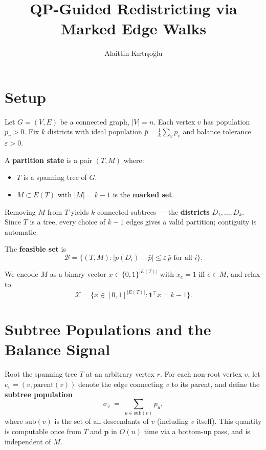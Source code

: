 \documentclass[11pt]{article}
\newcommand{\pbar}{\bar{p}}
\begin{document}
\title{QP-Guided Redistricting via Marked Edge Walks}
\author{Alaittin K\i rt\i \c{s}o\u{g}lu}
\maketitle


\section{Setup}\label{sec:setup}

Let $G = (V,E)$ be a connected graph, $|V| = n$. Each vertex $v$ has population $p_v > 0$. Fix $k$ districts with ideal population $\pbar = \frac{1}{k}\sum_v p_v$ and balance tolerance $\varepsilon > 0$.

A \textbf{partition state} is a pair $(T, M)$ where:
\begin{itemize}
\item $T$ is a spanning tree of $G$.
\item $M \subset E(T)$ with $|M| = k-1$ is the \textbf{marked set}.
\end{itemize}
Removing $M$ from $T$ yields $k$ connected subtrees --- the \textbf{districts} $D_1, \ldots, D_k$. Since $T$ is a tree, every choice of $k-1$ edges gives a valid partition; contiguity is automatic.

The \textbf{feasible set} is
\[
\mathcal{B} = \bigl\{(T, M) : |p(D_i) - \pbar| \leq \varepsilon\, \pbar \text{ for all } i\bigr\}.
\]

We encode $M$ as a binary vector $x \in \{0,1\}^{|E(T)|}$ with $x_e = 1$ iff $e \in M$, and relax to
\[
\mathcal{X} = \bigl\{x \in [0,1]^{|E(T)|} : \mathbf{1}^\top x = k-1\bigr\}.
\]


\section{Subtree Populations and the Balance Signal}\label{sec:subtree}

Root the spanning tree $T$ at an arbitrary vertex $r$. For each non-root vertex $v$, let $e_v = (v, \mathrm{parent}(v))$ denote the edge connecting $v$ to its parent, and define the \textbf{subtree population}
\[
\sigma_v \;=\; \sum_{u \in \mathrm{sub}(v)} p_u,
\]
where $\mathrm{sub}(v)$ is the set of all descendants of $v$ (including $v$ itself). This quantity is computable once from $T$ and $\mathbf{p}$ in $O(n)$ time via a bottom-up pass, and is independent of $M$.
\end{document}
